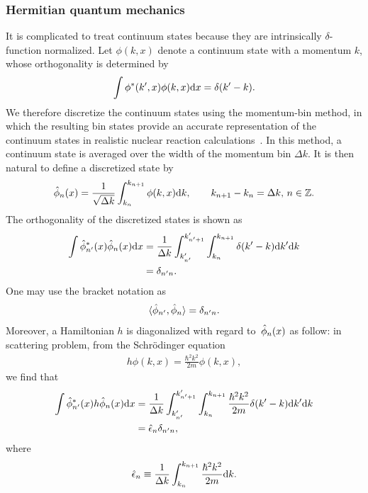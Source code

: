 \subsubsection{Hermitian quantum mechanics}
It is complicated to treat continuum states because they are intrinsically $\delta$-function normalized. Let $\phi(k,x)$ denote a continuum state with a momentum $k$, whose orthogonality is determined by
\begin{align}
    \int \phi^*(k',x) \phi(k,x) \mathrm{d} x = \delta(k'-k) .
\end{align}
We therefore discretize the continuum states using the momentum-bin method, in which the resulting bin states provide an accurate representation of the continuum states in realistic nuclear reaction calculations~\cite{Yahiro2012CDCC}. In this method, a continuum state is averaged over the width of the momentum bin $\Delta k$.
It is then natural to define a discretized state by
\begin{align}
    \Hat{\phi}_n (x) = \frac{1}{\sqrt{\Delta k}} \int_{k_n}^{k_{n+1}}\phi(k,x) \mathrm{d} k,
    \qquad
    k_{n+1} - k_n = \Delta k,\,
    n\in\mathbb{Z}.
\end{align}
The orthogonality of the discretized states is shown as
\begin{align}
    \int\Hat{\phi}_{n'}^*(x) \Hat{\phi}_n (x) \mathrm{d} x &= \frac{1}{\Delta k} \int_{k'_{n'}}^{k'_{n'+1}} \int_{k_n}^{k_{n+1}} \delta(k'-k) \mathrm{d} k' \mathrm{d} k
    \notag\\
    &= \delta_{n'n} .
\end{align}
One may use the bracket notation as
\begin{equation}
    \langle \Hat\phi_{n'},\Hat\phi_n\rangle=\delta_{n'n}.
\end{equation}
Moreover, a Hamiltonian $h$ is diagonalized with regard to~$\Hat{\phi}_n (x)$ as follow:
in scattering problem, from the Schr\"odinger equation
\begin{align}
    h \phi(k,x) = \frac{\hbar^2k^2}{2m} \phi(k,x) ,
\end{align}
we find that
\begin{align}
    \int\Hat{\phi}_{n'}^*(x) h \Hat{\phi}_n (x) \mathrm{d} x &= \frac{1}{\Delta k} \int_{k'_{n'}}^{k'_{n'+1}} \int_{k_n}^{k_{n+1}} \frac{\hbar^2 k^2}{2m} \delta(k'-k) \mathrm{d} k' \mathrm{d} k
    \notag\\
    &= \Hat{\epsilon}_n \delta_{n'n} ,
\end{align}
where
\begin{align}
    \Hat{\epsilon}_n \equiv \frac{1}{\Delta k} \int_{k_n}^{k_{n+1}} \frac{\hbar^2 k^2}{2m}\mathrm{d} k .
\end{align}
